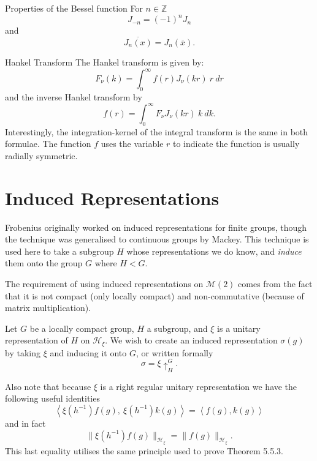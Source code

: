 \documentclass{article}
\begin{document}
\begin{Theorem}{Properties of the Bessel function} For $n \in \mathbb{Z}$
    \[%
        J_{-n} = (-1)^{n}J_{n} 
    \]%
    and
    \[%
        \overline{J_{n}(x)} = J_{n}(\overline{x}).
    \]%
    \QED
\end{Theorem}

\begin{Define}{Hankel Transform}
    The Hankel transform is given by:
    \[
        F_{\nu}(k) = \int^{\infty}_{0} f(r) J_{\nu}(kr) \ r \ dr
    \]
    and the inverse Hankel transform by
    \[
        f(r) = \int^{\infty}_{0} F_{\nu}J_{\nu}(kr) \ k \ dk.
    \]
    Interestingly, the integration-kernel of the integral transform is the same in both formulae. The function $f$ uses the variable $r$ to indicate the function is usually radially symmetric.
\end{Define}


\section{Induced Representations} 
\label{sec:induced_representations}
Frobenius originally worked on induced representations for finite groups, though the technique was generalised to continuous groups by Mackey. This technique is used here to take a subgroup $H$ whose representations we do know, and \textit{induce} them onto the group $G$ where $H < G$. 

The requirement of using induced representations on $\mathcal{M}(2)$ comes from the fact that it is not compact (only locally compact) and non-commutative (because of matrix multiplication). 

Let $G$ be a locally compact group, $H$ a subgroup, and $\xi$ is a unitary representation of $H$ on $\mathcal{H}_{\xi}$. We wish to create an induced representation $\sigma(g)$ by taking $\xi$ and inducing it onto $G$, or written formally 
\[ 
    \sigma = \xi \uparrow^{G}_{H}  
.\] 

\begin{remark}
Also note that because $\xi$ is a right regular unitary representation we have the following useful identities
\[ 
    \left\langle \xi(h^{-1})f(g), \ \xi(h^{-1})k(g) \right\rangle = \left\langle f(g), k(g) \right\rangle 
\]
and in fact
\[ 
    \| \xi(h^{-1})f(g) \|_{\mathcal{H}_{\xi}} = \| f(g) \|_{\mathcal{H}_{\xi}} .
\]
This last equality utilises the same principle used to prove Theorem 5.5.3.
\end{remark}
\end{document}

